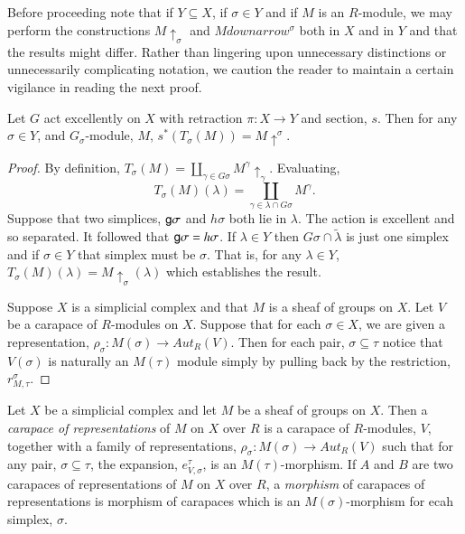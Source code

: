 Before proceeding note that if $Y \subseteq X$, if $\sigma \in Y$ and if $M$ is an $R$-module, we may perform the constructions $M \uparrow_{\sigma}$ and $M downarrow^{\sigma}$ both in $X$ and in $Y$ and that the results might differ. Rather than lingering upon unnecessary distinctions or unnecessarily complicating notation, we caution the reader to maintain a certain vigilance in reading the next proof.

\begin{lem}\label{art6-lemma-9.9}
Let $G$ act excellently on $X$ with retraction $\pi : X\rightarrow Y$ and section, $s$. Then for any $\sigma \in Y$, and $G_{\sigma}$-module, $M$, $s^{*}(T_{\sigma}(M)) = M \uparrow^{\sigma}$.
\end{lem}

\begin{proof}
By definition, $T_{\sigma}(M) = \coprod_{\gamma \in G\sigma}M^{\gamma} \uparrow_{\gamma}$. Evaluating,
$$
T_{\sigma}(M)(\lambda) = \coprod_{\gamma \in \lambda \cap G{\sigma}} M^{\gamma}.
$$
Suppose that two simplices, $\mathsf{g} \sigma$ and $h\sigma$ both  lie in $\lambda$. The action is excellent and so separated. It followed that $\mathsf{g} \sigma = h \sigma$. If $\lambda \in Y$ then $G\sigma \cap \tilde{\lambda}$ is just one simplex and if $\sigma \in Y$ that simplex must be $\sigma$. That is, for any $\lambda \in Y$, $T_{\sigma}(M)(\lambda) = M\uparrow_{\sigma}(\lambda)$ which establishes the result.

Suppose $X$ is a simplicial complex and that $M$ is a sheaf of groups on $X$. Let $V$ be a carapace of $R$-modules on $X$. Suppose that for each $\sigma \in X$, we are given a representation, $\rho_{\sigma}:M(\sigma) \rightarrow Aut_{R}(V)$. Then for each pair,  $\sigma \subseteq \tau$ notice that $V(\sigma)$ is naturally an $M(\tau)$ module simply by pulling back by the restriction, $r_{M, \tau}^{\sigma}$.
\end{proof}

\begin{definition}\label{art6-definition-9.10}
Let $X$ be a simplicial complex and let $M$ be a sheaf of groups on $X$. Then a \textit{carapace of representations} of $M$ on $X$ over $R$ is a carapace of $R$-modules, $V$, together with a family of representations, $\rho_{\sigma}: M(\sigma) \rightarrow Aut_{R}(V)$ such that for any pair, $\sigma \subseteq \tau$, the expansion, $e_{V, \sigma}^{\tau}$, is an $M(\tau)$-morphism. If $A$ and $B$ are two carapaces of representations of $M$ on $X$ over $R$, a \textit{morphism} of carapaces of representations is morphism of carapaces which is an $M(\sigma)$-morphism for ecah simplex, $\sigma$.
\end{definition}

